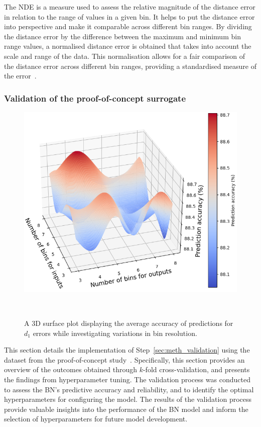 \documentclass[journal]{IEEEtran}
\begin{document}
The NDE is a measure used to assess the relative magnitude of the distance error in relation to the range of values in a given bin. It helps to put the distance error into perspective and make it comparable across different bin ranges. By dividing the distance error by the difference between the maximum and minimum bin range values, a normalised distance error is obtained that takes into account the scale and range of the data. This normalisation allows for a fair comparison of the distance error across different bin ranges, providing a standardised measure of the error~\cite{Conti2019}.

\subsubsection{Validation of the proof-of-concept surrogate}\label{sec:res_validation}

\begin{figure}[h]
    \centering
    \includegraphics[width=0.9\columnwidth]{figures/validation_plots/PROCESS/SA_3D_trimmed_39.png}
    \caption{\small A 3D surface plot displaying the average accuracy of predictions for $d_{1}$ errors while investigating variations in bin resolution.}~\label{fig:3D_SA_trimmed_39_D1}
\end{figure}

This section details the implementation of Step~\ref{sec:meth_validation} using the dataset from the proof-of-concept study~\cite{Griffiths2024}. Specifically, this section provides an overview of the outcomes obtained through $k$-fold cross-validation, and presents the findings from hyperparameter tuning. The validation process was conducted to assess the BN's predictive accuracy and reliability, and to identify the optimal hyperparameters for configuring the model. The results of the validation process provide valuable insights into the performance of the BN model and inform the selection of hyperparameters for future model development.
\end{document}
